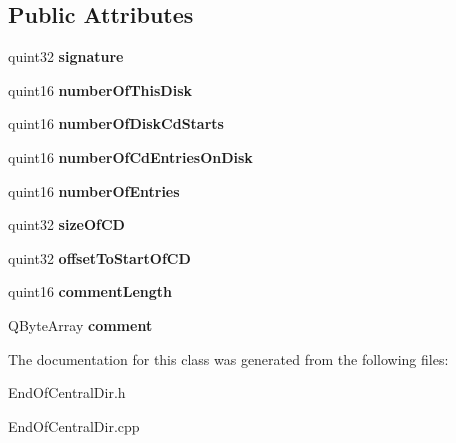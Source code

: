 \subsection*{Public Attributes}
\begin{DoxyCompactItemize}
\item 
quint32 {\bfseries signature}\hypertarget{class_end_of_central_dir_a88ddcca2f5770b337c0d8beb23e445b7}{}\label{class_end_of_central_dir_a88ddcca2f5770b337c0d8beb23e445b7}

\item 
quint16 {\bfseries number\+Of\+This\+Disk}\hypertarget{class_end_of_central_dir_a1bf2c1efc1a12681b764c15466bf575e}{}\label{class_end_of_central_dir_a1bf2c1efc1a12681b764c15466bf575e}

\item 
quint16 {\bfseries number\+Of\+Disk\+Cd\+Starts}\hypertarget{class_end_of_central_dir_a276c8c787515c18cd39ee05b1b2fb6e9}{}\label{class_end_of_central_dir_a276c8c787515c18cd39ee05b1b2fb6e9}

\item 
quint16 {\bfseries number\+Of\+Cd\+Entries\+On\+Disk}\hypertarget{class_end_of_central_dir_a41e255cd752ab176d4a9d313f9f7888a}{}\label{class_end_of_central_dir_a41e255cd752ab176d4a9d313f9f7888a}

\item 
quint16 {\bfseries number\+Of\+Entries}\hypertarget{class_end_of_central_dir_a03c8a68bbd6d7d13ce19e0036c7cbf27}{}\label{class_end_of_central_dir_a03c8a68bbd6d7d13ce19e0036c7cbf27}

\item 
quint32 {\bfseries size\+Of\+CD}\hypertarget{class_end_of_central_dir_a34d440ed32c0cd462c269bff402b3d77}{}\label{class_end_of_central_dir_a34d440ed32c0cd462c269bff402b3d77}

\item 
quint32 {\bfseries offset\+To\+Start\+Of\+CD}\hypertarget{class_end_of_central_dir_a8556db9e8542d23aa9f598dca9c3c019}{}\label{class_end_of_central_dir_a8556db9e8542d23aa9f598dca9c3c019}

\item 
quint16 {\bfseries comment\+Length}\hypertarget{class_end_of_central_dir_a6881b3c9ca20dddc8b46ba2c0ae3a233}{}\label{class_end_of_central_dir_a6881b3c9ca20dddc8b46ba2c0ae3a233}

\item 
Q\+Byte\+Array {\bfseries comment}\hypertarget{class_end_of_central_dir_af07b213bac17eb76daa6eb5bdb490fbf}{}\label{class_end_of_central_dir_af07b213bac17eb76daa6eb5bdb490fbf}

\end{DoxyCompactItemize}


The documentation for this class was generated from the following files\+:\begin{DoxyCompactItemize}
\item 
End\+Of\+Central\+Dir.\+h\item 
End\+Of\+Central\+Dir.\+cpp\end{DoxyCompactItemize}

